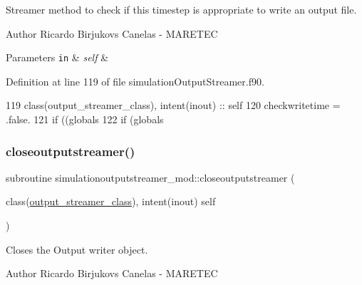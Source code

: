 Streamer method to check if this timestep is appropriate to write an output file. 

\begin{DoxyAuthor}{Author}
Ricardo Birjukovs Canelas -\/ M\+A\+R\+E\+T\+EC 
\end{DoxyAuthor}

\begin{DoxyParams}[1]{Parameters}
\mbox{\tt in}  & {\em self} & \\
\hline
\end{DoxyParams}


Definition at line 119 of file simulation\+Output\+Streamer.\+f90.


\begin{DoxyCode}
119     \textcolor{keywordtype}{class}(output\_streamer\_class), \textcolor{keywordtype}{intent(inout)} :: self
120     checkwritetime = .false.
121     \textcolor{keywordflow}{if} ((globals%
122     \textcolor{keywordflow}{if} (globals%
\end{DoxyCode}
\mbox{\label{namespacesimulationoutputstreamer__mod_adc0f21d337c283eee1f5f13b2eb51d52}} 
\subsubsection{\texorpdfstring{closeoutputstreamer()}{closeoutputstreamer()}}
{\footnotesize\ttfamily subroutine simulationoutputstreamer\+\_\+mod\+::closeoutputstreamer (\begin{DoxyParamCaption}\item[{class(\mbox{\hyperlink{structsimulationoutputstreamer__mod_1_1output__streamer__class}{output\+\_\+streamer\+\_\+class}}), intent(inout)}]{self }\end{DoxyParamCaption})\hspace{0.3cm}{\ttfamily [private]}}



Closes the Output writer object. 

\begin{DoxyAuthor}{Author}
Ricardo Birjukovs Canelas -\/ M\+A\+R\+E\+T\+EC 
\end{DoxyAuthor}


